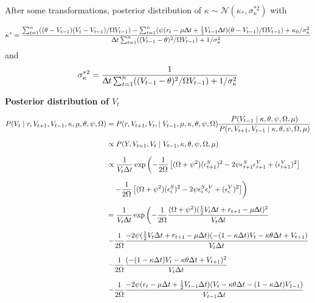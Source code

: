 \documentclass[12pt,a4paper]{article}
\numberwithin{equation}{section}
\begin{document}
After some transformations, posterior distribution of $\kappa \sim \mathcal{N}(\kappa_*, \sigma_\kappa^{*2})$ with

\[
\kappa^* = \frac{\sum_{t=1}^n ((\theta - V_{t-1}) (V_t - V_{t-1})/\Omega V_{t-1}) - \sum_{t=1}^n (\psi (r_t - \mu \Updelta t + \frac{1}{2} V_{t-1} \Updelta t )(\theta - V_{t-1})/\Omega V_{t-1}) + \kappa_0/\sigma_\kappa^2}{\Updelta t \sum_{t=1}^n ((V_{t-1}-\theta)^2/\Omega V_{t-1}) + 1 / \sigma_\kappa^2}
\]
and
\[
\sigma_\kappa^{*2} = \frac{1}{\Updelta t \sum_{t=1}^n ((V_{t-1}-\theta)^2/\Omega V_{t-1}) + 1 / \sigma_\kappa^2}
\]

\vspace{1em}

\textbf{Posterior distribution of $V_t$}
\vspace{1em}

\begin{align*}
P(V_t \mid r, V_{t+1}, V_{t-1}, \kappa, \mu, \theta, \psi, \Omega) &= P(r, V_{t+1}, V_{t}, \mid V_{t-1}, \mu, \kappa, \theta, \psi, \Omega) \frac{P(V_{t-1} \mid \kappa, \theta, \psi, \Omega, \mu)}{P(r, V_{t+1}, V_{t-1} \mid \kappa, \theta, \psi, \Omega, \mu)}\\[0.6em]
& \propto P(Y, V_{t+1}, V_{t} \mid V_{t-1}, \kappa, \theta, \psi, \Omega, \mu)\\[0.6em]
&\propto \frac{1}{V_t\Delta t}\exp\left(-\frac{1}{2\Omega}\left[(\Omega+\psi^2)(\epsilon_{t+1}^S)^2 - 2\psi\epsilon_{t+1}^S\epsilon_{t+1}^V + (\epsilon_{t+1}^V)^2\right]\right. \\[0.6em]
&\quad \left. -\frac{1}{2\Omega}\left[(\Omega+\psi^2)(\epsilon_i^S)^2 - 2\psi\epsilon_i^S\epsilon_i^V + (\epsilon_i^V)^2\right]\right)\\[0.6em]
&=\frac{1}{V_t \Updelta t}\exp\left(-\frac{1}{2 \Omega} \frac{(\Omega + \psi^2)(\frac{1}{2}V_t \Updelta t + r_{t+1} - \mu \Updelta t)^2}{V_t \Updelta t} \right. \\[0.6em] 
& \left. - \frac{1}{2\Omega} \frac{-2 \psi (\frac{1}{2} V_t \Delta t + r_{t+1} -\mu \Delta t ) (-(1-\kappa \Delta t)V_t - \kappa \theta \Delta t + V_{t+1})}{V_t \Delta t }\right. \\[0.6em]
& \left. - \frac{1}{2\Omega} \frac{(-(1-\kappa \Delta t)V_t - \kappa \theta \Delta t + V_{t+1})^2}{V_t \Delta t }\right. \\[0.6em]
& \left. - \frac{1}{2\Omega} \frac{-2 \psi (r_t  -\mu \Delta t  + \frac{1}{2} V_{t-1} \Delta t) ( V_t -\kappa \theta \Delta t  - (1- \kappa \Delta t) V_{1-1})}{V_{t-1} \Delta t }\right. \\[0.6em]

\end{align*}
\end{document}
